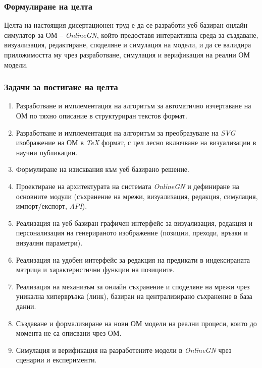 \subsubsection{Формулиране на целта}
\hspace*{2.5em}Целта на настоящия дисертационен труд е да се разработи уеб базиран онлайн симулатор за ОМ -- \textit{OnlineGN}, който предоставя интерактивна среда за създаване, визуализация, редактиране, споделяне и симулация на модели, и да се валидира приложимостта му чрез разработване, симулация и верификация на реални ОМ модели.

\subsubsection{Задачи за постигане на целта}

\begin{enumerate}[
	label=\textbf{Задача \arabic*.},
	ref=\textbf{Задача \arabic*},   
	leftmargin=2.5em,
	labelsep=0.8em,
	align=left
	]
\item Разработване и имплементация на алгоритъм за автоматично изчертаване на ОМ по тяхно описание в структуриран текстов формат.
 \label{task:auto-draw}
 
 \item Разработване и имплементация на алгоритъм за преобразуване на \textit{SVG} изображение на ОМ в \textit{TeX} формат, с цел лесно включване на визуализации в научни публикации.
 \label{task:svg-to-tex}
 
 \item Формулиране на изисквания към уеб базирано решение.
 \label{task:requirements}
 
 \item Проектиране на архитектурата на системата \textit{OnlineGN} и дефиниране на основните модули (съхранение на мрежи, визуализация, редакция, симулация, импорт/експорт, \textit{API}).
 \label{task:architecture}
 
 \item Реализация на уеб базиран графичен интерфейс за визуализация, редакция и персонализация на генерираното изображение (позиции, преходи, връзки и визуални параметри).
 \label{task:web-ui}
 
 \item Реализация на удобен интерфейс за редакция на предикати в индексираната матрица и характеристични функции на позициите.
 \label{task:predicates-ui}
 
 \item Реализация на механизъм за онлайн съхранение и споделяне на мрежи чрез уникална хипервръзка (линк), базиран на централизирано съхранение в база данни.
 \label{task:share-storage}
 
  \item Създаване и формализиране на нови ОМ модели на реални процеси, които до момента не са описвани чрез ОМ.
 \label{task:new-models}
 
  \item Симулация и верификация на разработените модели в \textit{OnlineGN} чрез сценарии и експерименти.
  \label{task:simulation}
\end{enumerate}


